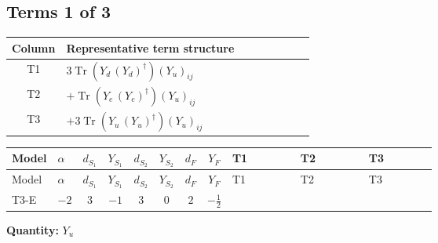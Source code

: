 \documentclass[8pt]{article}
\begin{document}
\begin{landscape}
\subsection*{Terms 1 of 3}
\begin{center}
\begin{tabular}{@{}c >{\raggedright\arraybackslash}p{0.82\linewidth}@{}}
\toprule
Column & Representative term structure \\
\midrule
T1 & \(\displaystyle 3 \operatorname{Tr}\!\left({Y_d}\,\left({Y_d}\right)^{\dagger}\right) \left({Y_u}\right)_{ij}\) \\
\midrule
T2 & \(\displaystyle +\operatorname{Tr}\!\left({Y_e}\,\left({Y_e}\right)^{\dagger}\right) \left({Y_u}\right)_{ij}\) \\
\midrule
T3 & \(\displaystyle +3 \operatorname{Tr}\!\left({Y_u}\,\left({Y_u}\right)^{\dagger}\right) \left({Y_u}\right)_{ij}\) \\
\midrule
\bottomrule
\end{tabular}
\end{center}
\smallskip
\tiny
\begin{longtable}{@{}llcccccc >{\raggedright\arraybackslash}p{0.21\linewidth} >{\raggedright\arraybackslash}p{0.21\linewidth} >{\raggedright\arraybackslash}p{0.21\linewidth}@{}}
\toprule
Model & $\alpha$ & $d_{S_1}$ & $Y_{S_1}$ & $d_{S_2}$ & $Y_{S_2}$ & $d_F$ & $Y_F$ & T1 & T2 & T3 \\
\midrule
\endfirsthead
\toprule
Model & $\alpha$ & $d_{S_1}$ & $Y_{S_1}$ & $d_{S_2}$ & $Y_{S_2}$ & $d_F$ & $Y_F$ & T1 & T2 & T3 \\
\midrule
\endhead
T3-E & $-2$ & $3$ & $-1$ & $3$ & $0$ & $2$ & $-\frac{1}{2}$ & \scriptsize\adjustbox{max width=\linewidth}{$\begin{gathered} 3 \operatorname{Tr}\!\left({Y_d}\,\left({Y_d}\right)^{\dagger}\right) \left({Y_u}\right)_{ij}\end{gathered}$} & \scriptsize\adjustbox{max width=\linewidth}{$\begin{gathered} +\operatorname{Tr}\!\left({Y_e}\,\left({Y_e}\right)^{\dagger}\right) \left({Y_u}\right)_{ij}\end{gathered}$} & \scriptsize\adjustbox{max width=\linewidth}{$\begin{gathered} +3 \operatorname{Tr}\!\left({Y_u}\,\left({Y_u}\right)^{\dagger}\right) \left({Y_u}\right)_{ij}\end{gathered}$} \\
\midrule
\bottomrule
\end{longtable}
\clearpage
\noindent\textbf{Quantity: }$Y_u$\par\smallskip

\end{landscape}
\end{document}
